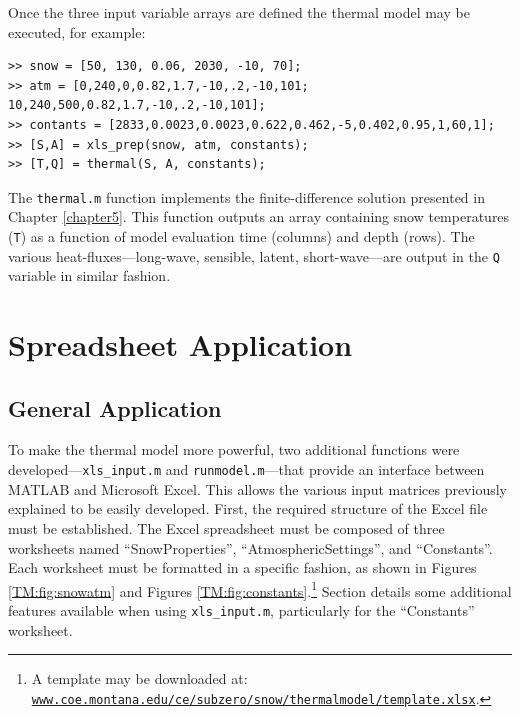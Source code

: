 Once the three input variable arrays are defined the thermal model may be executed, for example:
\begin{singlespaced}\begin{lstlisting}[style=inline]
>> snow = [50, 130, 0.06, 2030, -10, 70];
>> atm = [0,240,0,0.82,1.7,-10,.2,-10,101; 10,240,500,0.82,1.7,-10,.2,-10,101];
>> contants = [2833,0.0023,0.0023,0.622,0.462,-5,0.402,0.95,1,60,1];
>> [S,A] = xls_prep(snow, atm, constants);
>> [T,Q] = thermal(S, A, constants); 
\end{lstlisting}\end{singlespaced}

The \texttt{thermal.m} function implements the finite-difference solution presented in Chapter \ref{chapter5}.  This function outputs an array containing snow temperatures (\texttt{T}) as a function of model evaluation time (columns) and depth (rows).  The various heat-fluxes---long-wave, sensible, latent, short-wave---are output in the \texttt{Q} variable in similar fashion.

\section{Spreadsheet Application}\label{TM:sec:spread}
\subsection{General Application}
To make the thermal model more powerful, two additional functions were developed---\texttt{xls\_input.m} and \texttt{runmodel.m}---that provide an interface between MATLAB and Microsoft Excel. This allows the various input matrices previously explained to be easily developed. First, the required structure of the Excel file must be established.  The Excel spreadsheet must be composed of three worksheets named ``SnowProperties'', ``AtmosphericSettings'', and ``Constants''.  Each worksheet must be formatted in a specific fashion, as shown in Figures \ref{TM:fig:snowatm} and Figures \ref{TM:fig:constants}.\footnote{A template may be downloaded at: \href{http://www.coe.montana.edu/ce/subzero/snow/thermalmodel/template.xlsx}{\nolinkurl{www.coe.montana.edu/ce/subzero/snow/thermalmodel/template.xlsx}}.}  Section  details some additional features available when using \texttt{xls\_input.m}, particularly for the ``Constants'' worksheet.  

